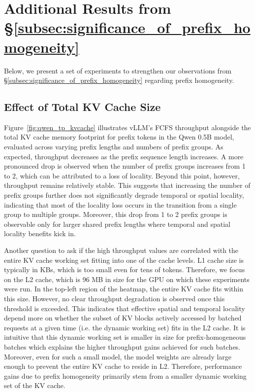 \section{Additional Results from \S\ref{subsec:significance_of_prefix_homogeneity}}
\label{sec:additional_results_section_3}
Below, we present a set of experiments to strengthen our observations from \S\ref{subsec:significance_of_prefix_homogeneity} regarding prefix homogeneity.

\subsection{Effect of Total KV Cache Size}
\label{subsec:cache_working_set_theory}
Figure~\ref{fig:qwen_tp_kvcache} illustrates vLLM's FCFS throughput alongside the total KV cache memory footprint for prefix tokens in the Qwen 0.5B model, evaluated across varying prefix lengths and numbers of prefix groups. As expected, throughput decreases as the prefix sequence length increases. A more pronounced drop is observed when the number of prefix groups increases from 1 to 2, which can be attributed to a loss of locality. Beyond this point, however, throughput remains relatively stable. This suggests that increasing the number of prefix groups further does not significantly degrade temporal or spatial locality, indicating that most of the locality loss occurs in the transition from a single group to multiple groups. Moreover, this drop from 1 to 2 prefix groups is observable only for larger shared prefix lengths where temporal and spatial locality benefits kick in.

Another question to ask if the high throughput values are correlated with the entire KV cache working set fitting into one of the cache levels. L1 cache size is typically in KBs, which is too small even for tens of tokens. Therefore, we focus on the L2 cache, which is 96 MB in size for the GPU on which these experiments were run. In the top-left region of the heatmap, the entire KV cache fits within this size. However, no clear throughput degradation is observed once this threshold is exceeded. This indicates that effective spatial and temporal locality depend more on whether the subset of KV blocks actively accessed by batched requests at a given time (i.e. the dynamic working set) fits in the L2 cache. It is intuitive that this dynamic working set is smaller in size for prefix-homogeneous batches which explains the higher throughput gains achieved for such batches. Moreover, even for such a small model, the model weights are already large enough to prevent the entire KV cache to reside in L2. Therefore, performance gains due to prefix homogeneity primarily stem from a smaller dynamic working set of the KV cache.

